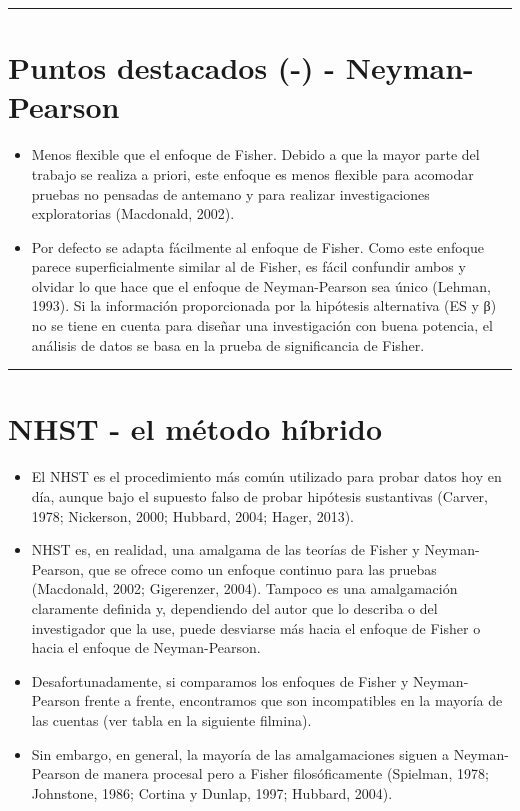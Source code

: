 \documentclass[
]{article}
\begin{document}
\begin{center}\rule{0.5\linewidth}{0.5pt}\end{center}

\hypertarget{puntos-destacados-----neyman-pearson}{%
\section{Puntos destacados (-) -
Neyman-Pearson}\label{puntos-destacados-----neyman-pearson}}

\begin{itemize}
\item
  Menos flexible que el enfoque de Fisher. Debido a que la mayor parte
  del trabajo se realiza a priori, este enfoque es menos flexible para
  acomodar pruebas no pensadas de antemano y para realizar
  investigaciones exploratorias (Macdonald, 2002).
\item
  Por defecto se adapta fácilmente al enfoque de Fisher. Como este
  enfoque parece superficialmente similar al de Fisher, es fácil
  confundir ambos y olvidar lo que hace que el enfoque de Neyman-Pearson
  sea único (Lehman, 1993). Si la información proporcionada por la
  hipótesis alternativa (ES y β) no se tiene en cuenta para diseñar una
  investigación con buena potencia, el análisis de datos se basa en la
  prueba de significancia de Fisher.
\end{itemize}

\begin{center}\rule{0.5\linewidth}{0.5pt}\end{center}

\hypertarget{nhst---el-muxe9todo-huxedbrido}{%
\section{NHST - el método
híbrido}\label{nhst---el-muxe9todo-huxedbrido}}

\begin{itemize}
\item
  El NHST es el procedimiento más común utilizado para probar datos hoy
  en día, aunque bajo el supuesto falso de probar hipótesis sustantivas
  (Carver, 1978; Nickerson, 2000; Hubbard, 2004; Hager, 2013).
\item
  NHST es, en realidad, una amalgama de las teorías de Fisher y
  Neyman-Pearson, que se ofrece como un enfoque continuo para las
  pruebas (Macdonald, 2002; Gigerenzer, 2004). Tampoco es una
  amalgamación claramente definida y, dependiendo del autor que lo
  describa o del investigador que la use, puede desviarse más hacia el
  enfoque de Fisher o hacia el enfoque de Neyman-Pearson.
\item
  Desafortunadamente, si comparamos los enfoques de Fisher y
  Neyman-Pearson frente a frente, encontramos que son incompatibles en
  la mayoría de las cuentas (ver tabla en la siguiente filmina).
\item
  Sin embargo, en general, la mayoría de las amalgamaciones siguen a
  Neyman-Pearson de manera procesal pero a Fisher filosóficamente
  (Spielman, 1978; Johnstone, 1986; Cortina y Dunlap, 1997; Hubbard,
  2004).
\end{itemize}
\end{document}
